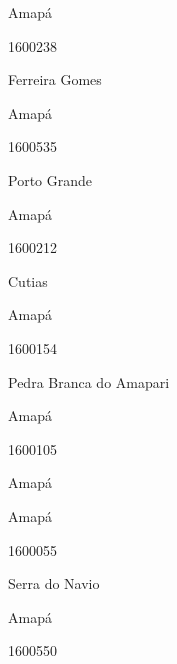 \documentclass[
  letterpaper,
]{report}
\begin{document}
\n      

Amapá

\n      

1600238

\n      

Ferreira Gomes

\n    

\n    

\n      

Amapá

\n      

1600535

\n      

Porto Grande

\n    

\n    

\n      

Amapá

\n      

1600212

\n      

Cutias

\n    

\n    

\n      

Amapá

\n      

1600154

\n      

Pedra Branca do Amapari

\n    

\n    

\n      

Amapá

\n      

1600105

\n      

Amapá

\n    

\n    

\n      

Amapá

\n      

1600055

\n      

Serra do Navio

\n    

\n    

\n      

Amapá

\n      

1600550

\n      
\end{document}
